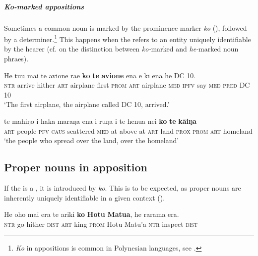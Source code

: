 \subparagraph{\textit{Ko}-marked appositions} Sometimes a common noun  is marked by the prominence marker \textit{ko} (), followed by a determiner.\footnote{\label{fn:277}\textit{Ko} in appositions is common in Polynesian languages, see \citet[45]{Clark1976}.} This happens when the  refers to an entity uniquely identifiable by the hearer (cf.  on the distinction between \textit{ko-}marked and \textit{he-}marked noun phraes).

\ea\label{ex:5.172}
\gll He tu{\ꞌ}u mai te {\ꞌ}avione ra{\ꞌ}e \textbf{ko} \textbf{te} \textbf{{\ꞌ}avione} ena e kī ena he DC 10. \\
\textsc{ntr} arrive hither \textsc{art} airplane first \textsc{prom} \textsc{art} airplane \textsc{med} \textsc{ipfv} say \textsc{med} \textsc{pred} DC 10 \\

\glt 
‘The first airplane, the airplane called DC 10, arrived.’ \textstyleExampleref{[R203.062]} 
\z

\ea\label{ex:5.173}
\gll te mahiŋo i haka maraŋa ena {\ꞌ}i ruŋa i te henua nei \textbf{ko} \textbf{te} \textbf{kāiŋa} \\
\textsc{art} people \textsc{pfv} \textsc{caus} scattered \textsc{med} at above at \textsc{art} land \textsc{prox} \textsc{prom} \textsc{art} homeland \\

\glt 
‘the people who spread over the land, over the homeland’ \textstyleExampleref{[R350.016]} 
\z

\subsection{Proper nouns in apposition}\label{sec:5.12.2}
If the  is a , it is introduced by \textit{ko}. This is to be expected, as proper nouns are inherently uniquely identifiable in a given context ().

\ea\label{ex:5.174}
\gll He oho mai era te {\ꞌ}ariki \textbf{ko} \textbf{Hotu} \textbf{Matu{\ꞌ}a}, he rarama era. \\
\textsc{ntr} go hither \textsc{dist} \textsc{art} king \textsc{prom} Hotu Matu’a \textsc{ntr} inspect \textsc{dist} \\

